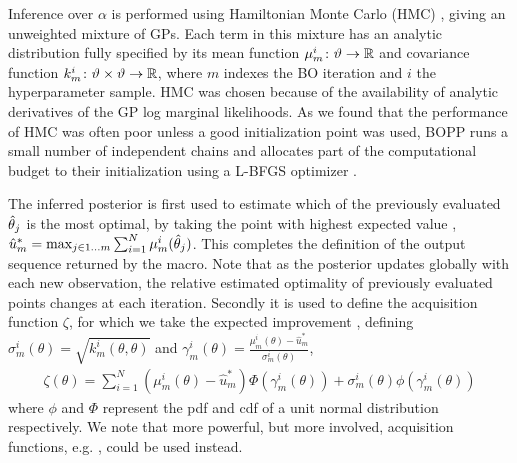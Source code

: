 Inference over $\alpha$ is performed using Hamiltonian Monte Carlo (HMC) \citep{duane1987hybrid}, giving an unweighted mixture of GPs.  Each term in this mixture has an analytic distribution fully specified by its mean function $\mu_m^i \colon \vartheta \rightarrow \mathbb{R}$ and covariance function $k_m^i \colon \vartheta \times \vartheta \rightarrow \mathbb{R}$, where $m$ indexes the BO iteration and $i$ the hyperparameter sample.  HMC was chosen because of the availability of analytic derivatives of the GP log marginal likelihoods.  As we found that the performance of HMC was often poor unless a good initialization point was used, BOPP runs a small number of independent chains and allocates part of the computational budget to their initialization using a L-BFGS optimizer \citep{broyden1970convergence}. 

The inferred posterior is first used to estimate which of the previously evaluated $\hat{\theta}_j$ is the most optimal, by taking the point with highest expected value
, $\hat{u}^*_m = \max_{j\in1\dots m} \sum_{i=1}^{N} \mu_{m}^i (\hat{\theta}_j)$.  This completes the definition of the output sequence returned by the \doopt macro.  Note that as the posterior updates globally with each new observation, the relative estimated optimality of previously evaluated points changes at each iteration.
Secondly it is used to define the acquisition function $\zeta$, for which we take the expected improvement \citep{snoek2012practical}, defining $\sigma_m^i\left(\theta\right) = \sqrt{k_m^i\left(\theta,\theta\right)}$ and $\gamma_m^i\left(\theta\right) = \frac{\mu_m^i \left(\theta\right)-\hat{u}_m^*}{\sigma_m^i\left(\theta\right)}$,
\begin{align}
\label{eq:exp-imp}
\zeta \left(\theta\right) = \sum_{i=1}^{N} \left(\mu_m^i\left(\theta\right)-\hat{u}_m^*\right)\Phi \left(\gamma_m^i\left(\theta\right)\right)+\sigma_m^i\left(\theta\right)\phi\left(\gamma_m^i\left(\theta\right)\right)
\end{align}
where $\phi$ and $\Phi$ represent the pdf and cdf of a unit normal distribution respectively.   We note that more powerful, but more involved, acquisition functions, e.g. \citep{hernandez2014predictive}, could be used instead.


